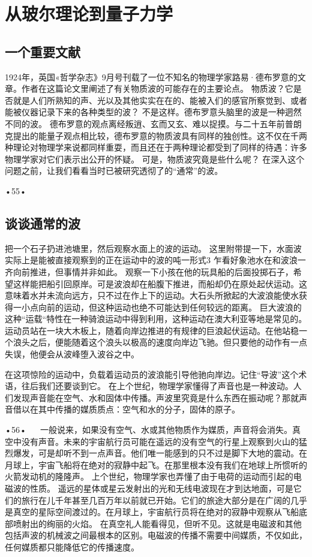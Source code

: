 \chapter{从玻尔理论到量子力学}

\section{一个重要文献}

1924年，英国«哲学杂志》9月号刊载了一位不知名的物理学家路易·德布罗意的文章。作者在这篇论文里阐述了有关物质波的可能存在的主要论点。
物质波？它是否就是人们所熟知的声、光以及其他实实在在的、能被入们的感官所察觉到、或者能被仪器记录下来的各种类型的波？
不是这样。德布罗意头脑里的波是一种迵然不同的波。
德布罗意的观点离经叛逍、玄而又玄、难以捉摸。与二十五年前普朗克提出的能量子观点相比较，德布罗意的物质波具有同样的独创性。这不仅在千两种理论对物理学来说都同样重耍，而且还在于两种理论都受到了同样的待遇：许多物理学家对它们表示出公开的怀疑。
可是，物质波究竟是些什么呢？
在深入这个问题之前，让我们看看当时已被研究透彻了的“通常”的波。

•55•
  
\section{谈谈通常的波}

把一个石子扔进池塘里，然后观察水面上的波的运动。
这里附带提一下，水面波实际上是能被直接观察到的正在运动中的波的吨一形式3
乍看好象池水在和波浪一齐向前推进，但事情并非如此。
观察一下小孩在他的玩具船的后面投掷石子，希望这样能把船引回原岸。可是波浪却在船腹下推进，而船却仍在原处起伏运动。这意味着水并未流向远方，只不过在作上下的运动。大石头所掀起的大波浪能使水获得一小点向前的运动，但这种运动也绝不可能达到任何较远的距离。
巨大波浪的这种“运载“特性在一种骑浪运动中得到利用，这种运动在澳大利亚等地是常见的。运动员站在一块大木板上，随着向岸边推进的有规律的巨浪起伏运动。在他站稳一个浪头之后，便能随着这个浪头以极高的速度向岸边飞驰。但只要他的动作有一点失误，他便会从波峰堕入波谷之中。

在这项惊险的运动中，负载着运动员的波浪能引导他驰向岸边。记住“导波”这个术语，往后我们还要谈到它。
在上个世纪，物理学家懂得了声音也是一种波动。人们发现声音能在空气、水和固体中传播。声波里究竟是什么东西在振动呢？那就声音借以在其中传播的媒质质点：空气和水的分子，固体的原子。

•56•
  
一般说来，如果没有空气、水或其他物质作为媒质，声音将会消失。真空中没有声音。未来的宇宙航行员可能在遥远的没有空气的行星上观察到火山的猛烈爆发，可是却听不到一点声音。他们唯一能感到的只不过是脚下大地的震动。在月球上，宇宙飞船将在绝对的寂静中起飞。在那里根本没有我们在地球上所惯听的火箭发动机的隆隆声。
上个世纪，物理学家也弄懂了由于电荷的运动而引起的电磁波的性质。
遥远的星体或星云发射出的光和无线电波现在才到达地面，可是它们的旅行在儿千年甚至几百万年以前就已开始。它们的旅途大部分是在广阔的几乎是真空的星际空间渡过的。在月球上，宇宙航行员将在绝对的寂静中观察从飞船底部喷射出的绚丽的火焰。
在真空礼人能看得见，但听不见。这就是电磁波和其他包括声波的机械波之间最根本的区别。电磁波的传播不需要中间媒质，不仅如此，任何媒质都只能降低它的传播速度。

